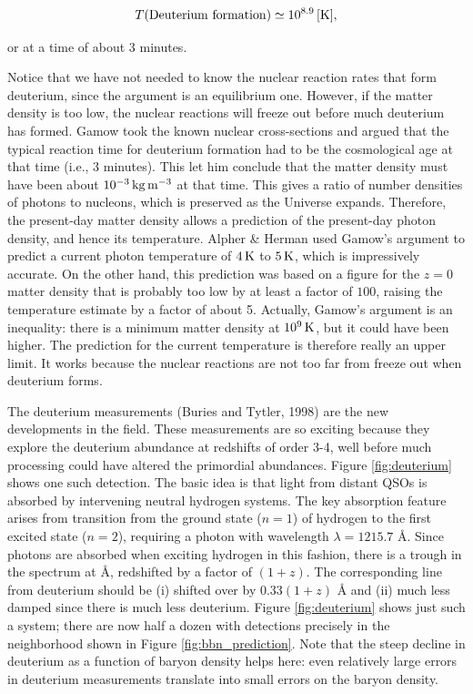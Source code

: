 \documentclass[a4paper,11pt]{article}
\begin{document}
\begin{align*}
    T({\mathrm{Deuterium~formation}}) \simeq 10^{8.9}\,[{\rm K}],
\end{align*}

{\noindent}or at a time of about 3 minutes.

{\noindent}Notice that we have not needed to know the nuclear reaction rates that form deuterium, since the argument is an equilibrium one. However, if the matter density is too low, the nuclear reactions will freeze out before much deuterium has formed. Gamow took the known nuclear cross-sections and argued that the typical reaction time for deuterium formation had to be the cosmological age at that time (i.e., 3 minutes). This let him conclude that the matter density must have been about $10^{-3}\,{\rm kg\,m^{-3}}$ at that time. This gives a ratio of number densities of photons to nucleons, which is preserved as the Universe expands. Therefore, the present-day matter density allows a prediction of the present-day photon density, and hence its temperature. Alpher \& Herman used Gamow's argument to predict a current photon temperature of $4\,{\rm K}$ to $5\,{\rm K}$, which is impressively accurate. On the other hand, this prediction was based on a figure for the $z=0$ matter density that is probably too low by at least a factor of $100$, raising the temperature estimate by a factor of about 5. Actually, Gamow's argument is an inequality: there is a minimum matter density at $10^9\,{\rm K}$, but it could have been higher. The prediction for the current temperature is therefore really an upper limit. It works because the nuclear reactions are not too far from freeze out when deuterium forms.

{\noindent}The deuterium measurements (Buries and Tytler, 1998) are the new developments in the field. These measurements are so exciting because they explore the deuterium abundance at redshifts of order 3-4, well before much processing could have altered the primordial abundances. Figure \ref{fig:deuterium} shows one such detection. The basic idea is that light from distant QSOs is absorbed by intervening neutral hydrogen systems. The key absorption feature arises from transition from the ground state ($n=1$) of hydrogen to the first excited state ($n=2$), requiring a photon with wavelength $\lambda = 1215.7$ \AA. Since photons are absorbed when exciting hydrogen in this fashion, there is a trough in the spectrum at {\AA}, redshifted by a factor of $(1+z)$. The corresponding line from deuterium should be (i) shifted over by $0.33(1+z)$ {\AA} and (ii) much less damped since there is much less deuterium. Figure \ref{fig:deuterium} shows just such a system; there are now half a dozen with detections precisely in the neighborhood shown in Figure \ref{fig:bbn_prediction}. Note that the steep decline in deuterium as a function of baryon density helps here: even relatively large errors in deuterium measurements translate into small errors on the baryon density.
\end{document}
